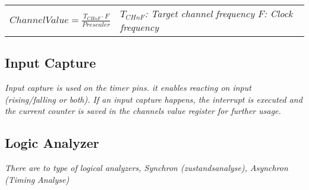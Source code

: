 \begin{tabular}{cp{}}
    $ChannelValue = \frac{T_{CHnF} \cdot F}{Prescaler}$&
    \textit{
        $T_{CHnF}$: Target channel frequency\newline
        $F$: Clock frequency
    } \\
\end{tabular}


\subsection{Input Capture}

\textit{
    Input capture is used on the timer pins. it enables
    reacting on input (rising/falling or both).\newline
    If an input capture happens, the interrupt is
    executed and the current counter is saved in the channels
    value register for further usage.
}

\subsection{Logic Analyzer}

\textit{
    There are to type of logical analyzers,
    Synchron (zustandsanalyse), Asynchron (Timing Analyse)
}
